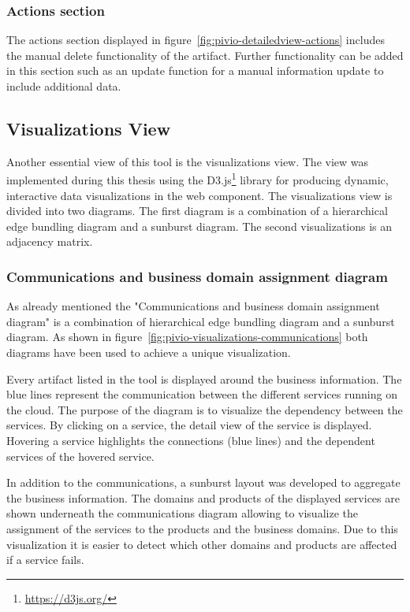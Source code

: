 \subsubsection{Actions section}

The actions section displayed in figure~\ref{fig:pivio-detailedview-actions} includes the manual delete functionality of the artifact. Further functionality can be added in this section such as an update function for a manual information update to include additional data.

\subsection{Visualizations View}\label{subsection:visualizations}

Another essential view of this tool is the visualizations view. The view was implemented during this thesis using the D3.js\footnote{\url{https://d3js.org/}} library for producing dynamic, interactive data visualizations in the web component. The visualizations view is divided into two diagrams. The first diagram is a combination of a hierarchical edge bundling diagram and a sunburst diagram. The second visualizations is an adjacency matrix.

\subsubsection{Communications and business domain assignment diagram}

As already mentioned the "Communications and business domain assignment diagram" is a combination of hierarchical edge bundling diagram and a sunburst diagram. As shown in figure~\ref{fig:pivio-visualizations-communications} both diagrams have been used to achieve a unique visualization.

Every artifact listed in the tool is displayed around the business information. The blue lines represent the communication between the different services running on the cloud. The purpose of the diagram is to visualize the dependency between the services. By clicking on a service, the detail view of the service is displayed. Hovering a service highlights the connections (blue lines) and the dependent services of the hovered service.

In addition to the communications, a sunburst layout was developed to aggregate the business information. The domains and products of the displayed services are shown underneath the communications diagram allowing to visualize the assignment of the services to the products and the business domains. Due to this visualization it is easier to detect which other domains and products are affected if a service fails.

